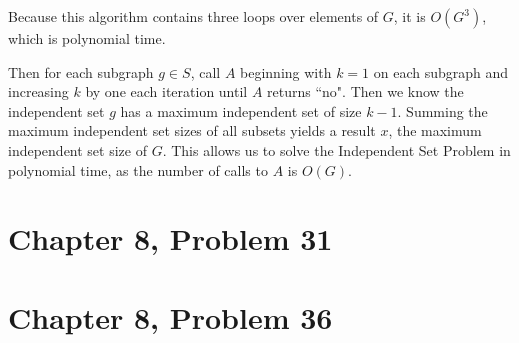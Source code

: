 \documentclass[12pt]{article}
\begin{document}
Because this algorithm contains three loops over elements of \(G\), it is \(O(G^3)\), which is polynomial time.

Then for each subgraph \(g\in S\), call \(A\) beginning with \(k=1\) on each subgraph and increasing \(k\) by one
each iteration until \(A\) returns ``no". Then we know the independent set \(g\) has a maximum independent set of size
\(k-1\). Summing the maximum independent set sizes of all subsets yields a result \(x\), the maximum independent set size
of \(G\). This allows us to solve the Independent Set Problem in polynomial time, as the number of calls to \(A\) is
\(O(G)\).

\pagebreak

\section*{Chapter 8, Problem 31}

\pagebreak

\section*{Chapter 8, Problem 36}
\end{document}
